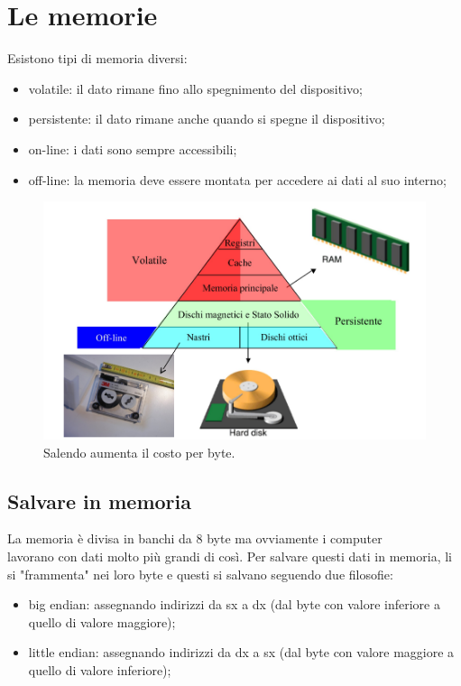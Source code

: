 \documentclass[12pt]{article}
\begin{document}
\section{Le memorie}
Esistono tipi di memoria diversi:
\begin{itemize}
    \item volatile: il dato rimane fino allo spegnimento del dispositivo;
    \item persistente: il dato rimane anche quando si spegne il dispositivo;
    \item on-line: i dati sono sempre accessibili;
    \item off-line: la memoria deve essere montata per accedere ai dati al suo interno;
\end{itemize}
\begin{figure}[!htb]
    \centering
    \includegraphics[width=.9\textwidth, height=.7\textheight,keepaspectratio]{organizzazione_elab/memorie.png} %
    \begin{center}
        \caption{\label{fig:tipi_memoria}Salendo aumenta il costo per byte.} %
    \end{center}
\end{figure}
\pagebreak
\subsection{Salvare in memoria}
La memoria è divisa in banchi da 8 byte ma ovviamente i computer \\
lavorano con dati molto più grandi di così.
Per salvare questi dati in memoria, li si "frammenta" nei loro byte e questi si salvano seguendo due filosofie:
\begin{itemize}
    \item big endian: assegnando indirizzi da sx a dx (dal byte con valore inferiore a quello di valore maggiore);
    \item little endian: assegnando indirizzi da dx a sx (dal byte con valore maggiore a quello di valore inferiore);
\end{itemize}
\end{document}
